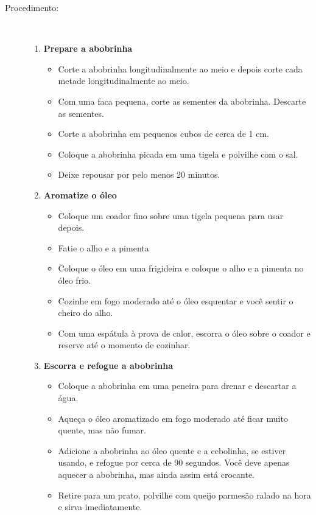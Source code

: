 \documentclass[11pt,letterpaper]{article}
\newcommand \fileName {GarlicParmesanZucchini}
\begin{document}
\begin {description}
\item [Procedimento:] \ \\
\begin {enumerate}
\item {\bf Prepare a abobrinha}
\begin {itemize}
\item Corte a abobrinha longitudinalmente ao meio e depois corte cada metade longitudinalmente ao meio.
\item Com uma faca pequena, corte as sementes da abobrinha. Descarte as sementes.
\item Corte a abobrinha em pequenos cubos de cerca de 1 cm.
\item Coloque a abobrinha picada em uma tigela e polvilhe com o sal.
\item Deixe repousar por pelo menos 20 minutos.
\end {itemize}
\item {\bf Aromatize o óleo}
\begin {itemize}
\item Coloque um coador fino sobre uma tigela pequena para usar depois.
\item Fatie o alho e a pimenta
\item Coloque o óleo em uma frigideira e coloque o alho e a pimenta no óleo frio.
\item Cozinhe em fogo moderado até o óleo esquentar e você sentir o cheiro do alho.
\item Com uma espátula à prova de calor, escorra o óleo sobre o coador e reserve até o momento de cozinhar.
\end {itemize}
\item {\bf Escorra e refogue a abobrinha}
\begin {itemize}
\item Coloque a abobrinha em uma peneira para drenar e descartar a água.
\item Aqueça o óleo aromatizado em fogo moderado até ficar muito quente, mas não fumar.
\item Adicione a abobrinha ao óleo quente e a cebolinha, se estiver usando, e refogue por cerca de 90 segundos. Você deve apenas aquecer a abobrinha, mas ainda assim está crocante.
\item Retire para um prato, polvilhe com queijo parmesão ralado na hora e sirva imediatamente.
\end {itemize}
\end {enumerate}
\end {description}

\end{document}
